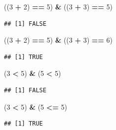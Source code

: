 \documentclass[]{book}
\newenvironment{Shaded}{\begin{snugshade}}{\end{snugshade}}
\newcommand{\DecValTok}[1]{\textcolor[rgb]{0.00,0.00,0.81}{#1}}
\newcommand{\NormalTok}[1]{#1}
\newcommand{\OperatorTok}[1]{\textcolor[rgb]{0.81,0.36,0.00}{\textbf{#1}}}
\newcommand{\StringTok}[1]{\textcolor[rgb]{0.31,0.60,0.02}{#1}}
\begin{document}
\begin{Shaded}
\begin{Highlighting}[]
\NormalTok{((}\DecValTok{3} \OperatorTok{+}\StringTok{ }\DecValTok{2}\NormalTok{) }\OperatorTok{==}\StringTok{ }\DecValTok{5}\NormalTok{) }\OperatorTok{&}\StringTok{ }\NormalTok{((}\DecValTok{3} \OperatorTok{+}\StringTok{ }\DecValTok{3}\NormalTok{) }\OperatorTok{==}\StringTok{ }\DecValTok{5}\NormalTok{)}
\end{Highlighting}
\end{Shaded}

\begin{verbatim}
## [1] FALSE
\end{verbatim}

\begin{Shaded}
\begin{Highlighting}[]
\NormalTok{((}\DecValTok{3} \OperatorTok{+}\StringTok{ }\DecValTok{2}\NormalTok{) }\OperatorTok{==}\StringTok{ }\DecValTok{5}\NormalTok{) }\OperatorTok{&}\StringTok{ }\NormalTok{((}\DecValTok{3} \OperatorTok{+}\StringTok{ }\DecValTok{3}\NormalTok{) }\OperatorTok{==}\StringTok{ }\DecValTok{6}\NormalTok{)}
\end{Highlighting}
\end{Shaded}

\begin{verbatim}
## [1] TRUE
\end{verbatim}

\begin{Shaded}
\begin{Highlighting}[]
\NormalTok{(}\DecValTok{3} \OperatorTok{<}\StringTok{ }\DecValTok{5}\NormalTok{) }\OperatorTok{&}\StringTok{ }\NormalTok{(}\DecValTok{5} \OperatorTok{<}\StringTok{ }\DecValTok{5}\NormalTok{)}
\end{Highlighting}
\end{Shaded}

\begin{verbatim}
## [1] FALSE
\end{verbatim}

\begin{Shaded}
\begin{Highlighting}[]
\NormalTok{(}\DecValTok{3} \OperatorTok{<}\StringTok{ }\DecValTok{5}\NormalTok{) }\OperatorTok{&}\StringTok{ }\NormalTok{(}\DecValTok{5} \OperatorTok{<=}\StringTok{ }\DecValTok{5}\NormalTok{)}
\end{Highlighting}
\end{Shaded}

\begin{verbatim}
## [1] TRUE
\end{verbatim}
\end{document}
